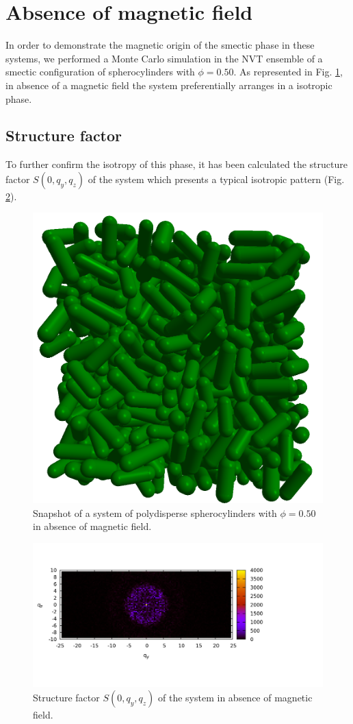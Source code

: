 \documentclass{article}
\begin{document}
\section{Absence of magnetic field}

In order to demonstrate the magnetic origin of the smectic phase in these systems, we performed a Monte Carlo simulation in the NVT ensemble of a smectic configuration of spherocylinders with $\phi = 0.50$. As represented in Fig. \ref{fig:noB_snapshot}, in absence of a magnetic field the system preferentially arranges in a isotropic phase.

\subsection{Structure factor}
To further confirm the isotropy of this phase, it has been calculated the structure factor $S(0, q_y, q_z)$ of the system which presents a typical isotropic pattern (Fig. \ref{fig:Syz_noB}).


\begin{figure}
    \centering
    \includegraphics[width=0.5\columnwidth]{Isotropic_phase_snap.png}
    \caption{Snapshot of a system of polydisperse spherocylinders with $\phi = 0.50$ in absence of magnetic field.}
    \label{fig:noB_snapshot}
\end{figure}

\begin{figure}
    \centering
    \includegraphics[width=1.2\columnwidth]{Syz_noB.png}
    \caption{Structure factor $S(0, q_y, q_z)$ of the system in absence of magnetic field.}
    \label{fig:Syz_noB}
\end{figure}
\end{document}
